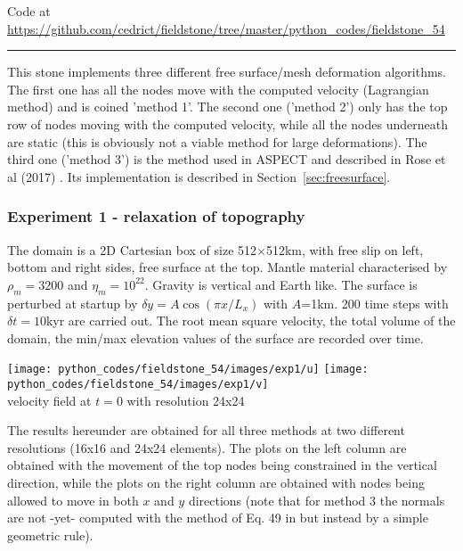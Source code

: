 

\begin{center}
Code at \url{https://github.com/cedrict/fieldstone/tree/master/python_codes/fieldstone_54}
\end{center}

\par\noindent\rule{\textwidth}{0.4pt}



This stone implements three different free surface/mesh deformation algorithms. 
The first one has all the nodes move with the computed velocity (Lagrangian method)
and is coined 'method 1'. 
The second one ('method 2') only has the top row of nodes moving with the computed velocity, 
while all the nodes underneath are static (this is obviously not a viable method for 
large deformations). 
The third one ('method 3') is the method used in ASPECT and described in Rose et al (2017) \cite{robh17}.
Its implementation is described in Section~\ref{sec:freesurface}.

\subsubsection*{Experiment 1 - relaxation of topography}

The domain is a 2D Cartesian box of size 512$\times$512km, with free slip on left, 
bottom and right sides, free surface at the top. 
Mantle material characterised by $\rho_m=3200$ and $\eta_m=10^{22}$. 
Gravity is vertical and Earth like. 
The surface is perturbed at startup by $\delta y = A \cos (\pi x /L_x)$ with $A$=1km.
200 time steps with $\delta t=10$kyr are carried out.
The root mean square velocity, the total volume of the domain, the min/max elevation
values of the surface are recorded over time. 

\begin{center}
\texttt{[image: python\_codes/fieldstone\_54/images/exp1/u]}
\texttt{[image: python\_codes/fieldstone\_54/images/exp1/v]}\\
{\captionfont velocity field at $t=0$ with resolution 24x24}
\end{center}

The results hereunder are obtained for all three methods at two different resolutions (16x16 
and 24x24 elements).
The plots on the left column are obtained with the movement of the top nodes being constrained in 
the vertical direction, while the plots on the right column are obtained with nodes being 
allowed to move in both $x$ and $y$ directions (note that for method 3 the normals are not -yet-
computed with the method of Eq. 49 in \cite{robh17} but instead by a simple geometric rule).

